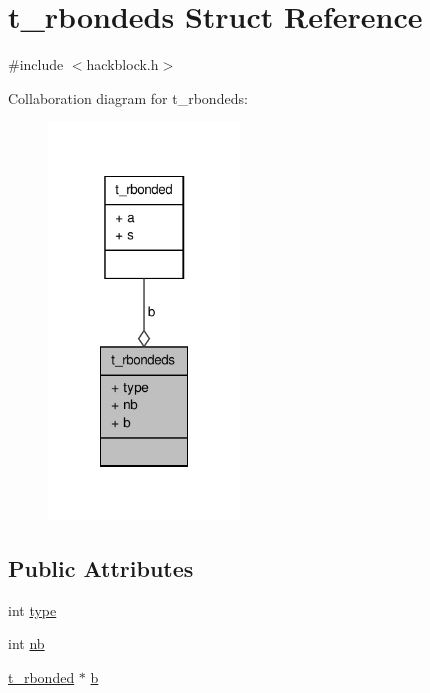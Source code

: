 \hypertarget{structt__rbondeds}{\section{t\-\_\-rbondeds \-Struct \-Reference}
\label{structt__rbondeds}
}


{\ttfamily \#include $<$hackblock.\-h$>$}



\-Collaboration diagram for t\-\_\-rbondeds\-:
\nopagebreak
\begin{figure}[H]
\begin{center}
\leavevmode
\includegraphics[width=144pt]{structt__rbondeds__coll__graph}
\end{center}
\end{figure}
\subsection*{\-Public \-Attributes}
\begin{DoxyCompactItemize}
\item 
int \hyperlink{structt__rbondeds_a023e82065b774845a28fc6b23619a8df}{type}
\item 
int \hyperlink{structt__rbondeds_a128fad253a8fb95a02ef35dcfe03b3d0}{nb}
\item 
\hyperlink{structt__rbonded}{t\-\_\-rbonded} $\ast$ \hyperlink{structt__rbondeds_aad8a8e039ee5ab741b8705da1162e081}{b}
\end{DoxyCompactItemize}


